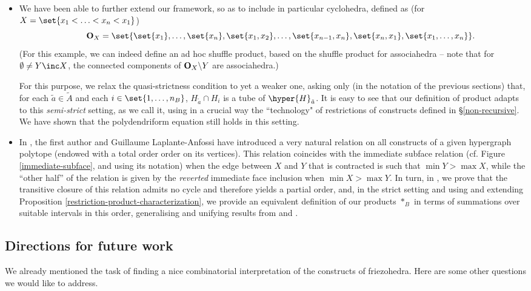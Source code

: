 \begin{itemize}
\item We have been able to further extend our framework, so as to include in particular cyclohedra, defined as (for $X=\set{x_1<\ldots<x_n<x_1}$)
$$\quad\quad{\bf O}_X=\set{\set{x_1},\ldots,\set{x_n},\set{x_1,x_2},\ldots,\set{x_{n-1},x_n},\set{x_n,x_1},\set{x_1,\ldots, x_n}}.$$  (For this example, we can indeed define an ad hoc  shuffle product, based on the shuffle product for associahedra -- note that for $\emptyset\neq Y\inc X$, the connected components of ${\bf O}_X\backslash Y$ are associahedra.) 

 For this purpose, we  relax the quasi-strictness condition to  yet a weaker one, asking only (in the notation of the previous sections) that, for each $\tilde a\in\tilde A$ and each $i\in\set{1,\ldots,n_B}$, $H_{\tilde a}\cap H_i$ is a tube of $\hyper{H}_{\tilde a}$. It is easy to see that our definition of product adapts to this  {\it semi-strict} setting, as we call it, using 
 in a crucial way the ``technology" of restrictions of constructs defined in  \S\ref{non-recursive}. We have shown  that the polydendriform equation still holds in this setting.
 
\item In \cite{CLA24}, the first author  and Guillaume Laplante-Anfossi have introduced a very natural relation on all constructs of a given hypergraph polytope (endowed with  a total order order on its vertices). This relation coincides with the immediate subface relation (cf. Figure \ref{immediate-subface}, and using its notation) when the  edge between $X$ and $Y$ that is contracted is such that $\min Y  > \max X$, while the ``other half'' of the relation is given by the {\em reverted} immediate face inclusion when $\min X  > \max Y$.
In turn, in  \cite{RSON}, we prove that the transitive closure of this relation admits no cycle and therefore yields a partial order, and, in the strict setting and using and extending Proposition \ref{restriction-product-characterization}, we provide an equivalent definition of our products $\ast_B$  in terms of  summations over suitable intervals in this order, generalising and unifying results from  \cite{PalaciosRonco} and \cite{RoncoGTO}.
\end{itemize}

\subsection*{Directions for future work}
 We already mentioned the task of  finding a nice combinatorial interpretation of the constructs of friezohedra. Here are some other questions we would like to address.

